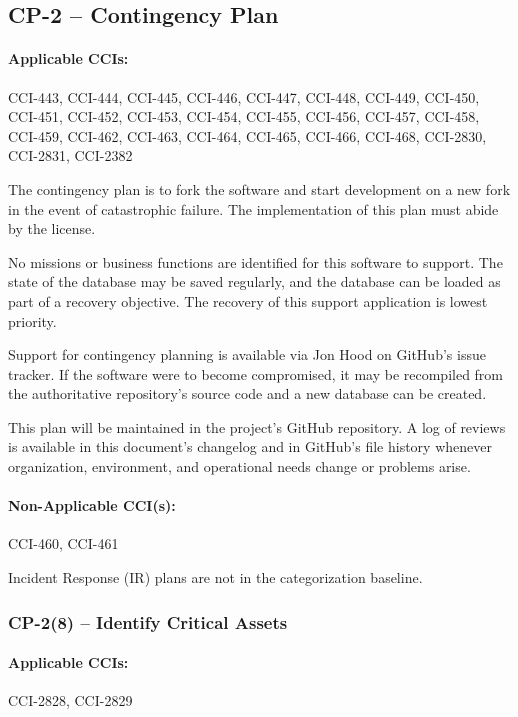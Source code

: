\documentclass[letterpaper, 10pt, twoside]{article}
\begin{document}
\subsection{CP-2 -- Contingency Plan}
\label{sec:cp-2}

\paragraph{Applicable CCIs:} CCI-443, CCI-444, CCI-445, CCI-446, CCI-447, CCI-448, CCI-449, CCI-450, CCI-451, CCI-452, CCI-453, CCI-454, CCI-455, CCI-456, CCI-457, CCI-458, CCI-459, CCI-462, CCI-463, CCI-464, CCI-465, CCI-466, CCI-468, CCI-2830, CCI-2831, CCI-2382

The contingency plan is to fork the software and start development on a new fork in the event of catastrophic failure. The implementation of this plan must abide by the license.

No missions or business functions are identified for this software to support. The state of the database may be saved regularly, and the database can be loaded as part of a recovery objective. The recovery of this support application is lowest priority.

Support for contingency planning is available via Jon Hood on GitHub's issue tracker. If the software were to become compromised, it may be recompiled from the authoritative repository's source code and a new database can be created.

This plan will be maintained in the project's GitHub repository. A log of reviews is available in this document's changelog and in GitHub's file history whenever organization, environment, and operational needs change or problems arise.

\paragraph{Non-Applicable CCI(s):} CCI-460, CCI-461

Incident Response (IR) plans are not in the categorization baseline.

\subsubsection{CP-2(8) -- Identify Critical Assets}

\paragraph{Applicable CCIs:} CCI-2828, CCI-2829
\end{document}
